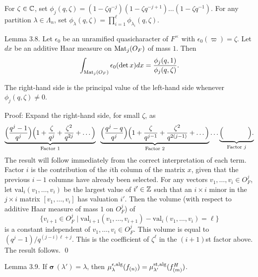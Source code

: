 \documentclass{amsart}
\begin{document}
For 
  $ \zeta \in \Bbb C $,
set
  $ \phi_j (q,\zeta) =
    ( 1 - \zeta q^{-j})
    ( 1 - \zeta q^{-j+1}) \dots
    ( 1 -  {\zeta}q^{-1}) $.
For any partition
  $ \lambda \in \Lambda_n $,
set
  $ \phi_{\lambda} (q, \zeta) = 
    \prod_{i=1}^{\ell} \phi_{\lambda_i}
    (q, \zeta) $.

\proclaim Lemma {3.8}.
Let
  $ \epsilon_0 $
be an unramified quasicharacter of $F^\times$ with
  $ \epsilon_0 (\varpi) = \zeta $.  Let
  $ d x $ be
an additive Haar measure on 
  $ \text{{\rm Mat}}_j (O_F) $
of mass $1$.
Then
%
$$
  \int_{ \text{{\rm Mat}}_j (O_F)}
  \epsilon_0 (\det x) d x =
  \frac
     {\phi_j (q, 1)}
     {\phi_j (q, \zeta)}.
$$
%
\finishproclaim

\noindent
The right-hand side is the principal value of the
  left-hand side  whenever
  $ \phi_j (q,\zeta) \neq 0 $.

\pproclaim Proof:
Expand the right-hand side, for small
  $ \zeta  $, as
%
$$
    \underbrace{\Bigl(
       \frac {q^j -1}{q^j}
    \Bigr)
    \Bigl(
      1 +
      \frac {\zeta}{q^j} +
      \frac {\zeta^2}{q^{2j}} + \dots
    \Bigr)
  }_{\text{Factor $1$}} \;\;
  \underbrace %
    {\Bigl(
       \frac {q^j -q}{q^j}
    \Bigr)
    \Bigl(
      1 +
      \frac {\zeta}{q^{j-1}} +
      \frac {\zeta^2}{q^{2(j-1)}} + \dots
    \Bigr)
  }_{\text{Factor $2$}}
\dots
    \underbrace %
       {\Bigl( 
          \hskip .5in
       \Bigr).
    }_{\text{Factor $j$}}
$$
%
The result will follow immediately from the correct interpretation
of each term.
Factor $i$ is the contribution of the $i$th column of the matrix
  $x$, given that the previous
  $ i - 1 $ 
columns have already been selected.
For any vectors
  $ v_1, \dots , v_i \in O_F^j $,
let
  $ \text{val}_i (v_1, \dots , v_i) $
be the largest value of 
  $ i' \in {\Bbb Z} $
such that an 
  $ i \times i $
minor in the 
  $ j \times i $ 
matrix
  $ [v_1, \dots , v_i ] $
has valuation $i'$.  
Then the volume (with respect to additive Haar measure
  of mass  $1$ on
  $ O_F^j $) of
%
  $$\{ v_{i+1} \in O_F^j \mid
   \text{val}_{i+1} (v_1 , \dots, v_{i+1}) -
    \text{val}_i (v_1 , \dots, v_i) = \ell\}$$
is a constant independent of 
  $ v_1, \dots , v_i \in O_F^j $.
This volume is equal to
  $ (q^j-1)/q^{(j-i)\ell + j}$.
This is the coefficient of 
  $ \zeta^{\ell} $
in the 
  $ (i+1)$st factor above.
The result follows.
\qed\finishpproclaim
 
\proclaim Lemma {3.9}.
If
   $\pmb\sigma \, (\lambda') = \lambda $,
then
  $ \mu_{\lambda}^{\epsilon, \text{{\rm alg}} }
      (f_{(n)}) =
    \mu_{\lambda'}^{\text{{\rm st,alg}}}
      (f^H_{(m)})$.
\finishproclaim
\end{document}
